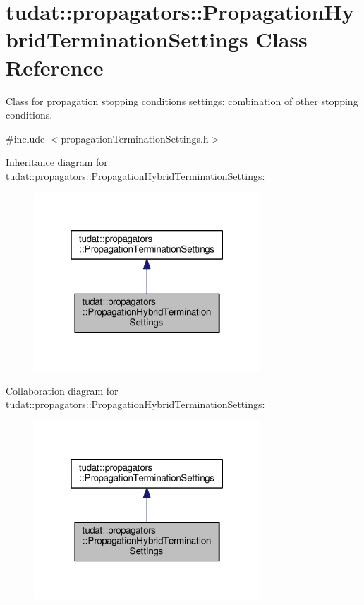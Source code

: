 \hypertarget{classtudat_1_1propagators_1_1PropagationHybridTerminationSettings}{}\section{tudat\+:\+:propagators\+:\+:Propagation\+Hybrid\+Termination\+Settings Class Reference}
\label{classtudat_1_1propagators_1_1PropagationHybridTerminationSettings}


Class for propagation stopping conditions settings\+: combination of other stopping conditions.  




{\ttfamily \#include $<$propagation\+Termination\+Settings.\+h$>$}



Inheritance diagram for tudat\+:\+:propagators\+:\+:Propagation\+Hybrid\+Termination\+Settings\+:
\nopagebreak
\begin{figure}[H]
\begin{center}
\leavevmode
\includegraphics[width=241pt]{classtudat_1_1propagators_1_1PropagationHybridTerminationSettings__inherit__graph}
\end{center}
\end{figure}


Collaboration diagram for tudat\+:\+:propagators\+:\+:Propagation\+Hybrid\+Termination\+Settings\+:
\nopagebreak
\begin{figure}[H]
\begin{center}
\leavevmode
\includegraphics[width=241pt]{classtudat_1_1propagators_1_1PropagationHybridTerminationSettings__coll__graph}
\end{center}
\end{figure}
